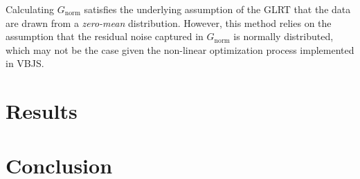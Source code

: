 \documentclass{article}
\begin{document}
Calculating $G_\text{norm}$ satisfies the underlying assumption of the GLRT that the data are drawn from a \emph{zero-mean} distribution. However, this method relies on the assumption that the residual noise captured in $G_\text{norm}$ is normally distributed, which may not be the case given the non-linear optimization process implemented in VBJS.

\section{Results}


\section{Conclusion}




\end{document}
